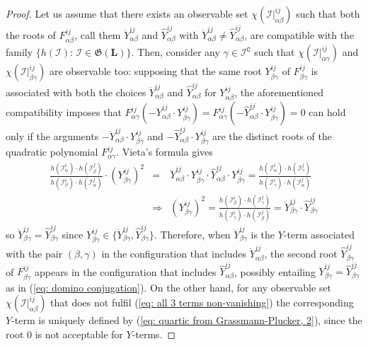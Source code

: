 \documentclass[10pt]{article}
\theoremstyle{remark}%
\theoremstyle{definition}%
\begin{document}
\begin{proof}
Let us assume that there exists an observable set $\chi(\mathcal{I}|_{\alpha\beta}^{ij})$ such that both the roots of $F_{\alpha\beta}^{ij}$, call them $\ddot{Y}_{\alpha\beta}^{ij}$ and $ \widehat{Y}_{\alpha\beta}^{ij}$ with $\ddot{Y}_{\alpha\beta}^{ij}\neq \widehat{Y}_{\alpha\beta}^{ij}$, are compatible with the family $\{h(\mathcal{I}):\,\mathcal{I}\in\mathfrak{G}(\mathbf{L})\}$. Then, consider any $\gamma\in\mathcal{I}^{\mathtt{C}}$ such that $\chi(\mathcal{I}|_{\alpha\gamma}^{ij})$ and $\chi(\mathcal{I}|_{\beta\gamma}^{ij})$ are observable too: supposing that the same root $Y_{\beta\gamma}^{ij}$ of $F_{\beta\gamma}^{ij}$ is associated with both the choices $\ddot{Y}_{\alpha\beta}^{ij}$ and $\widehat{Y}_{\alpha\beta}^{ij}$ for $Y_{\alpha\beta}^{ij}$, the aforementioned compatibility imposes that  
$
F_{\alpha\gamma}^{ij}(-\ddot{Y}_{\alpha\beta}^{ij}\cdot Y_{\beta\gamma}^{ij}) = 
F_{\alpha\gamma}^{ij}(-\widehat{Y}_{\alpha\beta}^{ij}\cdot Y_{\beta\gamma}^{ij}) = 0 
$ can hold only if the arguments $-\ddot{Y}_{\alpha\beta}^{ij}\cdot Y_{\beta\gamma}^{ij}$ and $-\widehat{Y}_{\alpha\beta}^{ij}\cdot Y_{\beta\gamma}^{ij}$ are the distinct roots of the quadratic polynomial $F_{\alpha\gamma}^{ij}$. Vieta's formula gives
\begin{eqnarray}
    \frac{h(\mathcal{I}_{\alpha}^{i})\cdot h(\mathcal{I}_{\beta}^{j})}{h(\mathcal{I}_{\beta}^{i})\cdot h(\mathcal{I}_{\alpha}^{j})}\cdot(Y_{\beta\gamma}^{ij})^{2} & = & \ddot{Y}_{\alpha\beta}^{ij}\cdot Y_{\beta\gamma}^{ij} \cdot \widehat{Y}_{\alpha\beta}^{ij}\cdot Y_{\beta\gamma}^{ij} 
    = \frac{h(\mathcal{I}_{\alpha}^{i})\cdot h(\mathcal{I}_{\gamma}^{j})}{h(\mathcal{I}_{\gamma}^{i})\cdot h(\mathcal{I}_{\alpha}^{j})} \nonumber \\ 
    & \Rightarrow & 
    (Y_{\beta\gamma}^{ij})^{2} = \frac{h(\mathcal{I}_{\beta}^{i})\cdot h(\mathcal{I}_{\gamma}^{j})}{h(\mathcal{I}_{\gamma}^{i})\cdot h(\mathcal{I}_{\beta}^{j})} = \ddot{Y}_{\beta\gamma}^{ij}\cdot \widehat{Y}_{\beta\gamma}^{ij}
\label{eq: domino conjugation}
\end{eqnarray}
so $\ddot{Y}_{\beta\gamma}^{ij} = \widehat{Y}_{\beta\gamma}^{ij}$ since $Y_{\beta\gamma}^{ij}\in\{\ddot{Y}_{\beta\gamma}^{ij}, \widehat{Y}_{\beta\gamma}^{ij}\}$. 
Therefore, when $\ddot{Y}_{\beta\gamma}^{ij}$ is the $Y$-term associated with the pair $(\beta,\gamma)$ in the configuration that includes $\ddot{Y}_{\alpha\beta}^{ij}$, the second root $\widehat{Y}_{\beta\gamma}^{ij}$ of $F_{\beta\gamma}^{ij}$ appears in the configuration that includes $\widehat{Y}_{\alpha\beta}^{ij}$, possibly entailing $\ddot{Y}_{\beta\gamma}^{ij}=\widehat{Y}_{\beta\gamma}^{ij}$ as in (\ref{eq: domino conjugation}). On the other hand, for any observable set $\chi(\mathcal{I}|_{\alpha\beta}^{ij})$ that does not fulfil (\ref{eq: all 3 terms non-vanishing}) the corresponding $Y$-term is uniquely defined by (\ref{eq: quartic from Grassmann-Plucker, 2}), since the root $0$ is not acceptable for $Y$-terms. 


\end{proof}
\end{document}
